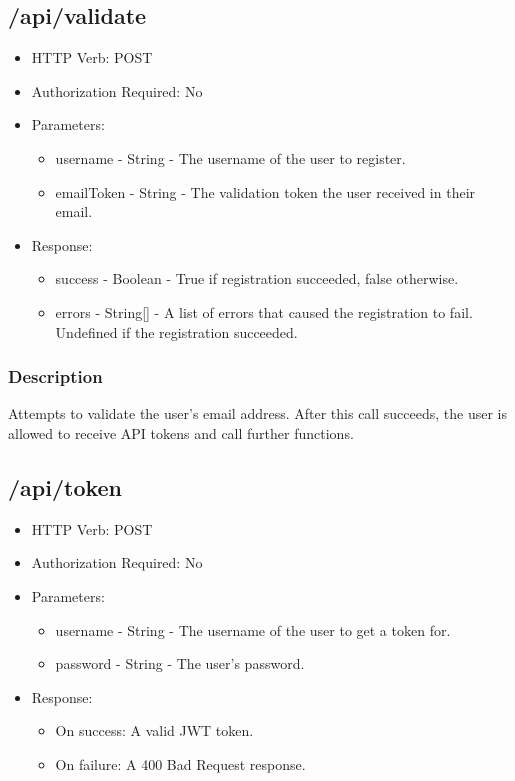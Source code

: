 \documentclass[12pt]{article}
\begin{document}
        \subsection{/api/validate}
            \begin{itemize}
                \item HTTP Verb: POST
                \item Authorization Required: No
                \item Parameters:
                \begin{itemize}
                    \item username - String - The username of the user to register.
                    \item emailToken - String - The validation token the user received in their email.
                \end{itemize}
                \item Response:
                \begin{itemize}
                    \item success - Boolean - True if registration succeeded, false otherwise.
                    \item errors - String[] - A list of errors that caused the registration to fail. Undefined if the registration succeeded.
                \end{itemize}
            \end{itemize}
            \subsubsection{Description}
                Attempts to validate the user's email address. After this call succeeds, the user is allowed to receive API tokens and call further functions.
    
        \subsection{/api/token}
            \begin{itemize}
                \item HTTP Verb: POST
                \item Authorization Required: No
                \item Parameters:
                \begin{itemize}
                    \item username - String - The username of the user to get a token for.
                    \item password - String - The user's password.
                \end{itemize}
                \item Response:
                \begin{itemize}
                    \item On success: A valid JWT token.
                    \item On failure: A 400 Bad Request response.
                \end{itemize}
            \end{itemize}
\end{document}
